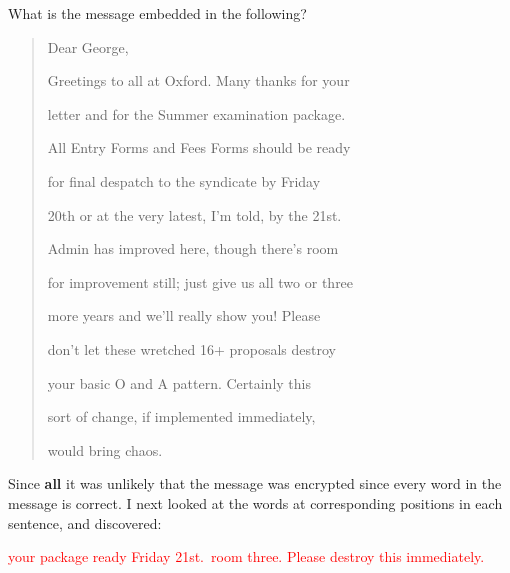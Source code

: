 \begin{problem}
What is the message embedded in the following?

\vspace{1ex}
\begin{quote}
\begin{sffamily}
\hspace{2.5ex}Dear George,

Greetings to all at Oxford.  Many thanks for your

letter and for the Summer examination package.

All Entry Forms and Fees Forms should be ready

for final despatch to the syndicate by Friday

20th or at the very latest, I'm told, by the 21st.

Admin has improved here, though there's room

for improvement still; just give us all two or three

more years and we'll really show you!  Please

don't let these wretched 16+ proposals destroy

your basic O and A pattern.  Certainly this

sort of change, if implemented immediately,

would bring chaos.
\end{sffamily}
\end{quote}
\end{problem}

\begin{Answer}
  
Since \textbf{all} it was unlikely that the message was encrypted
since every word in the message is correct.
I next looked at the words at corresponding positions in each sentence,
and discovered:


  \textcolor{red}{your package ready Friday 21st.\ room three. Please destroy this immediately.}

\end{Answer}

